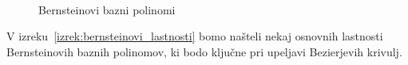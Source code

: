 \documentclass[isrm2, tisk]{fmfdelo}
\begin{document}
    \begin{figure}[h!]
        \captionsetup[subfigure]{labelformat=empty}
        \centering
        \qquad
         \\
        \qquad
        \caption{Bernsteinovi bazni polinomi}
        \label{fig:bernstein-base}
    \end{figure}
    V izreku~\ref{izrek:bernsteinovi_lastnosti} bomo našteli nekaj osnovnih lastnosti Bernsteinovih baznih polinomov, ki bodo ključne pri upeljavi Bezierjevih krivulj.
\end{document}
